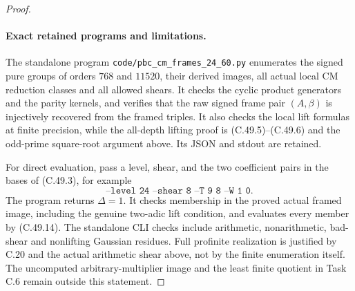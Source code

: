 \begin{proof}
\paragraph{Exact retained programs and limitations.}
The standalone program \texttt{code/pbc\_cm\_frames\_24\_60.py}
enumerates the signed pure groups of orders $768$ and $11520$,
their derived images, all actual local CM reduction classes and all
allowed shears. It checks the cyclic product generators and the
parity kernels, and verifies that the raw signed frame pair
$(A,\beta)$ is injectively recovered from the framed triples.
It also checks the local lift formulas at finite precision, while
the all-depth lifting proof is (C.49.5)--(C.49.6) and the odd-prime
square-root argument above. Its JSON and stdout are retained.

For direct evaluation, pass a level, shear, and the two coefficient
pairs in the bases of (C.49.3), for example
\[
 \texttt{--level 24 --shear 8 --T 9 8 --W 1 0}.
\]
The program returns $\Delta=1$. It checks membership in the proved
actual framed image, including the genuine two-adic lift condition,
and evaluates every member by (C.49.14). The standalone CLI checks
include arithmetic, nonarithmetic, bad-shear and nonlifting Gaussian
residues. Full profinite realization is justified by C.20 and the
actual arithmetic shear above, not by the finite enumeration itself.
The uncomputed arbitrary-multiplier image and the least finite
quotient in Task C.6 remain outside this statement.
\end{proof}
